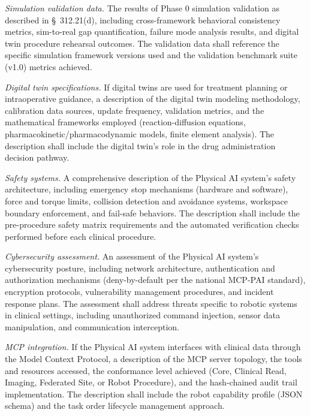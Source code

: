 \documentclass[11pt]{article}
\begin{document}
\begin{description}[leftmargin=0.8cm,style=sameline]
\item[(v)] \textit{Simulation validation data.} The results of Phase 0 simulation validation as described in \S~312.21(d), including cross-framework behavioral consistency metrics, sim-to-real gap quantification, failure mode analysis results, and digital twin procedure rehearsal outcomes. The validation data shall reference the specific simulation framework versions used and the validation benchmark suite (v1.0) metrics achieved.

\item[(vi)] \textit{Digital twin specifications.} If digital twins are used for treatment planning or intraoperative guidance, a description of the digital twin modeling methodology, calibration data sources, update frequency, validation metrics, and the mathematical frameworks employed (reaction-diffusion equations, pharmacokinetic/pharmacodynamic models, finite element analysis). The description shall include the digital twin's role in the drug administration decision pathway.

\item[(vii)] \textit{Safety systems.} A comprehensive description of the Physical AI system's safety architecture, including emergency stop mechanisms (hardware and software), force and torque limits, collision detection and avoidance systems, workspace boundary enforcement, and fail-safe behaviors. The description shall include the pre-procedure safety matrix requirements and the automated verification checks performed before each clinical procedure.

\item[(viii)] \textit{Cybersecurity assessment.} An assessment of the Physical AI system's cybersecurity posture, including network architecture, authentication and authorization mechanisms (deny-by-default per the national MCP-PAI standard), encryption protocols, vulnerability management procedures, and incident response plans. The assessment shall address threats specific to robotic systems in clinical settings, including unauthorized command injection, sensor data manipulation, and communication interception.

\item[(ix)] \textit{MCP integration.} If the Physical AI system interfaces with clinical data through the Model Context Protocol, a description of the MCP server topology, the tools and resources accessed, the conformance level achieved (Core, Clinical Read, Imaging, Federated Site, or Robot Procedure), and the hash-chained audit trail implementation. The description shall include the robot capability profile (JSON schema) and the task order lifecycle management approach.


\end{description}
\end{document}
